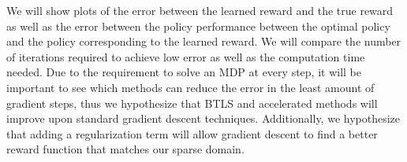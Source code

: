 \documentclass[10pt,a4paper]{article}
\begin{document}
We will show plots of the error between the learned reward and the true reward as well as the error between the policy performance between the optimal policy and the policy corresponding to the learned reward. We will compare the number of iterations required to achieve low error as well as the computation time needed. Due to the requirement to solve an MDP at every step, it will be important to see which methods can reduce the error in the least amount of gradient steps, thus we hypothesize that BTLS and accelerated methods will improve upon standard gradient descent techniques. Additionally, we hypothesize that adding a regularization term will allow gradient descent to find a better reward function that matches our sparse domain.



\end{document}
